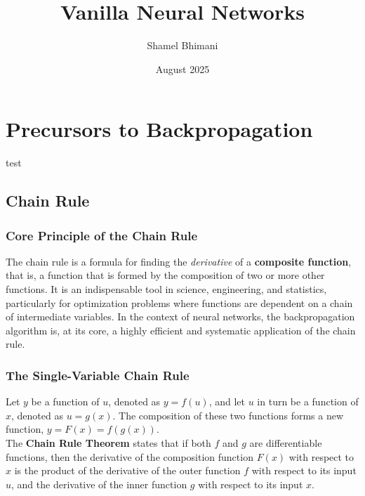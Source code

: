 \documentclass{article}
\title{Vanilla Neural Networks}
\author{Shamel Bhimani}
\date{August 2025}
\theoremstyle{plain}
\theoremstyle{definition}
\theoremstyle{remark}
\begin{document}
\maketitle

\tableofcontents
\newpage


\section{Precursors to Backpropagation}\label{sec:precursors-to-backpropagation}
test

  \subsection{Chain Rule}\label{subsec:chain-rule}

  \subsubsection{Core Principle of the Chain Rule}
\noindent The chain rule is a formula for finding the \textit{derivative} of
a \textbf{composite function}, that is, a function that is formed by the composition of two or more other functions.
  It is an indispensable tool in science, engineering, and statistics,
particularly for optimization problems where functions are dependent on a
chain of intermediate variables. In the context of neural networks, the
backpropagation algorithm is, at its core, a highly efficient and systematic
application of the chain rule.

  \subsubsection{The Single-Variable Chain Rule}
  \noindent Let $y$ be a function of $u$, denoted as $y = f(u)$, and let $u$
in turn be a function of $x$, denoted as $u = g(x)$. The composition of
these two functions forms a new function, $y = F(x) = f(g(x))$.\\

  \noindent The \textbf{Chain Rule Theorem} states that if both $f$ and $g$
are differentiable functions, then the derivative of the composition function $F(x)$ with respect to $x$ is the product of the derivative of the outer function $f$ with respect to its input $u$, and the derivative of the inner function $g$ with respect to its input $x$.\\
\end{document}
